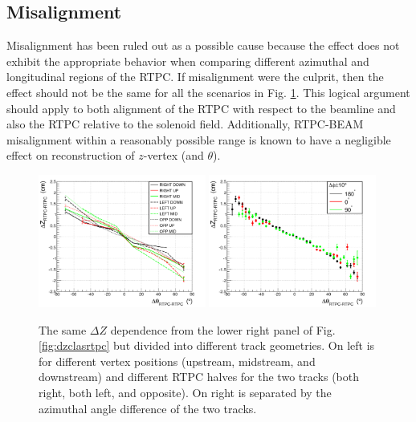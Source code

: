 \documentclass[amsmath,amssymb,notitlepage,11pt]{revtex4-1}
\begin{document}
\subsection{Misalignment}
Misalignment has been ruled out as a possible cause because the effect does not exhibit the appropriate behavior when comparing different azimuthal and longitudinal regions of the RTPC.  If misalignment were the culprit, then the effect should not be the same for all the scenarios in Fig. \ref{fig:dz_regions}.  This logical argument should apply to both alignment of the RTPC with respect to the beamline and also the RTPC relative to the solenoid field.  Additionally, RTPC-BEAM misalignment within a reasonably possible range is known to have a negligible effect on reconstruction of $z$-vertex (and $\theta$).%
\begin{figure}[htbp]\centering
    \includegraphics[width=0.49\textwidth]{pics/dz_sides_zpos_small.png}
    \includegraphics[width=0.49\textwidth]{pics/dz_090180_small.png}
    \caption{The same $\Delta Z$ dependence from the lower right panel of Fig. \ref{fig:dzclasrtpc} but divided into different track geometries.  On left is for different vertex positions (upstream, midstream, and downstream) and different RTPC halves for the two tracks (both right, both left, and opposite).  On right is separated by the azimuthal angle difference of the two tracks. \label{fig:dz_regions}}
\end{figure}
\end{document}
